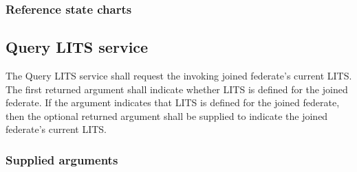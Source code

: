 \begin{compactstdpage}

    \subsubsection{Reference state charts}


    \subsection{Query LITS service}

    The Query LITS service shall request the invoking joined federate's current LITS. The first returned argument shall indicate whether LITS is defined for the joined federate. If the argument indicates that LITS is defined for the joined federate, then the optional returned argument shall be supplied to indicate the joined federate's current LITS.

    \subsubsection{Supplied arguments}



\end{compactstdpage}

\clearpage


